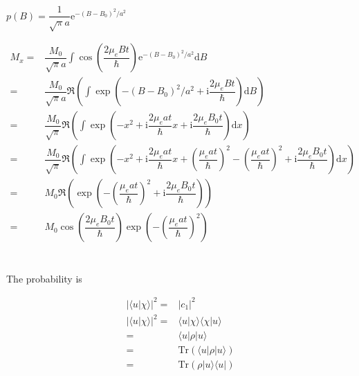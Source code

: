 \documentclass[10pt,fleqn]{article}
\newcommand{\ud}{\mathrm{d}}
\newcommand{\ue}{\mathrm{e}}
\newcommand{\ui}{\mathrm{i}}
\newcommand{\Tr}{\mathrm{Tr}}
\newcommand{\eqar}[1]
{
  \begin{align*}
    #1
  \end{align*}
}
\newcommand{\paren}[1]{{\left({#1}\right)}}
\newcommand{\abs}[1]{{\left|{#1}\right|}}
\begin{document}
\subsection{}
$p(B)=\dfrac{1}{\sqrt{\pi}a}\ue^{-\paren{B-B_0}^2/a^2}$
\eqar{
  M_x=&\dfrac{M_0}{\sqrt{\pi}a}\int\cos\paren{\dfrac{2\mu_eBt}{\hbar}}\ue^{-\paren{B-B_0}^2/a^2}\ud B\\
  =&\dfrac{M_0}{\sqrt{\pi}a}\Re\paren{\int\exp\paren{-\paren{B-B_0}^2/a^2+\ui\dfrac{2\mu_eBt}{\hbar}}\ud B}\\
  =&\dfrac{M_0}{\sqrt{\pi}}\Re\paren{\int\exp\paren{-x^2+\ui\dfrac{2\mu_eat}{\hbar}x+\ui\dfrac{2\mu_eB_0t}{\hbar}}\ud x}\\
  =&\dfrac{M_0}{\sqrt{\pi}}\Re\paren{\int\exp\paren{-x^2+\ui\dfrac{2\mu_eat}{\hbar}x+\paren{\dfrac{\mu_eat}{\hbar}}^2-\paren{\dfrac{\mu_eat}{\hbar}}^2+\ui\dfrac{2\mu_eB_0t}{\hbar}}\ud x}\\
  =&M_0\Re\paren{\exp\paren{-\paren{\dfrac{\mu_eat}{\hbar}}^2+\ui\dfrac{2\mu_eB_0t}{\hbar}}}\\
  =&M_0\cos\paren{\dfrac{2\mu_eB_0t}{\hbar}}\exp\paren{-\paren{\dfrac{\mu_eat}{\hbar}}^2}
}
\subsection{}
\subsection{}
\section{}
The probability is
\eqar{
  \abs{\langle u|\chi\rangle}^2=&\abs{c_1}^2\\
  \abs{\langle u|\chi\rangle}^2=&\langle u|\chi\rangle\langle \chi|u\rangle\\
  =&\langle u|\rho|u\rangle\\
  =&\Tr\paren{\langle u|\rho|u\rangle}\\
  =&\Tr\paren{\rho|u\rangle\langle u|}
}
\section{}
\subsection{}
\subsection{}
\end{document}
